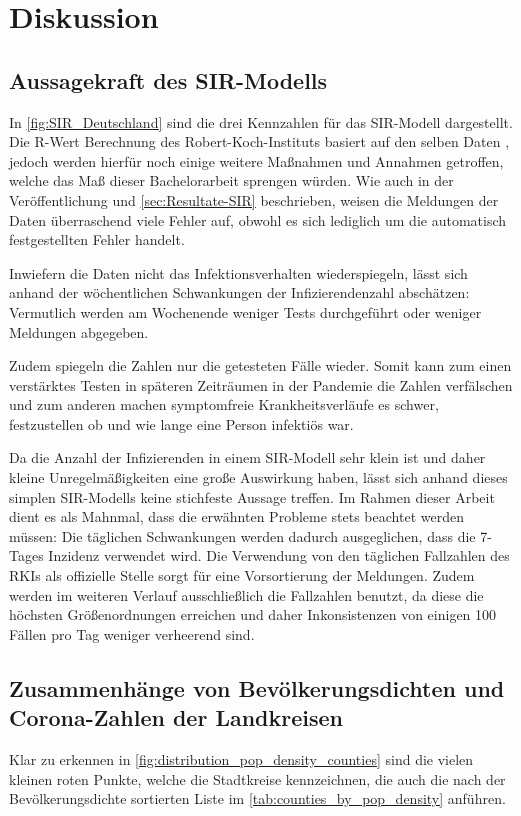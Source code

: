 \chapter{Diskussion}\label{chap:Diskussion}
\section{Aussagekraft des SIR-Modells}
In \autoref{fig:SIR_Deutschland} sind die drei Kennzahlen für das SIR-Modell dargestellt. Die R-Wert Berechnung des Robert-Koch-Instituts basiert auf den selben Daten \autocite{RKI_Bulletin}, jedoch werden hierfür noch einige weitere Maßnahmen und Annahmen getroffen, welche das Maß dieser Bachelorarbeit sprengen würden.
Wie auch in der Veröffentlichung und \autoref{sec:Resultate-SIR} beschrieben, weisen die Meldungen der Daten überraschend viele Fehler auf, obwohl es sich lediglich um die automatisch festgestellten Fehler handelt.

Inwiefern die Daten nicht das Infektionsverhalten wiederspiegeln, lässt sich anhand der wöchentlichen Schwankungen der Infizierendenzahl abschätzen: Vermutlich werden am Wochenende weniger Tests durchgeführt oder weniger Meldungen abgegeben. 

Zudem spiegeln die Zahlen nur die getesteten Fälle wieder. Somit kann zum einen verstärktes Testen in späteren Zeiträumen in der Pandemie die Zahlen verfälschen und zum anderen machen symptomfreie Krankheitsverläufe es schwer, festzustellen ob und wie lange eine Person infektiös war.

Da die Anzahl der Infizierenden in einem SIR-Modell sehr klein ist und daher kleine Unregelmäßigkeiten eine große Auswirkung haben, lässt sich anhand dieses simplen SIR-Modells keine stichfeste Aussage treffen.
Im Rahmen dieser Arbeit dient es als Mahnmal, dass die erwähnten Probleme stets beachtet werden müssen:
Die täglichen Schwankungen werden dadurch ausgeglichen, dass die 7-Tages Inzidenz verwendet wird. Die Verwendung von den täglichen Fallzahlen des RKIs als offizielle Stelle sorgt für eine Vorsortierung der Meldungen. Zudem werden im weiteren Verlauf ausschließlich die Fallzahlen benutzt, da diese die höchsten Größenordnungen erreichen und daher Inkonsistenzen von einigen 100 Fällen pro Tag weniger verheerend sind.

\section{Zusammenhänge von Bevölkerungsdichten und Corona-Zahlen der Landkreisen}\label{sec:discussion:pop_density_counties}
Klar zu erkennen in \autoref{fig:distribution_pop_density_counties} sind die vielen kleinen roten Punkte, welche die Stadtkreise kennzeichnen, die auch die nach der Bevölkerungsdichte sortierten Liste im \autoref{tab:counties_by_pop_density} anführen.

